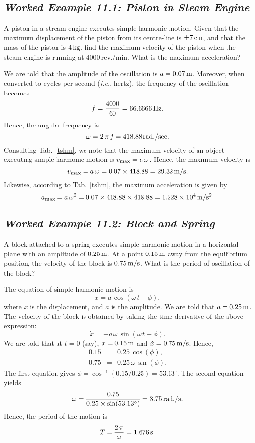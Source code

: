 \subsection*{\em Worked Example 11.1: Piston in Steam Engine}
 A piston in a stream engine executes simple harmonic motion.
Given that the maximum displacement of the piston from its centre-line is $\pm 7\,{\rm cm}$,
and that the mass of the piston is $4\,{\rm kg}$, find the maximum velocity of the piston
when the steam engine is running at 4000\,rev./min. What is the maximum acceleration?

 We are told that the amplitude of the oscillation is $a=0.07\,{\rm m}$. 
Moreover, when converted to cycles per second ({\em i.e.}, hertz), the frequency of the oscillation becomes
$$
f = \frac{4000}{60} = 66.6666\,{\rm Hz}.
$$
Hence, the angular frequency is
$$
\omega = 2\,\pi\,f = 418.88\,{\rm rad./sec}.
$$
Consulting Tab.~\ref{tshm}, we note that the maximum velocity of an object executing
simple harmonic motion is $v_{\rm max} = a\,\omega$. Hence, the maximum velocity is
$$
v_{\rm max} = a\,\omega = 0.07\times 418.88 = 29.32\,{\rm m/s}.
$$
Likewise, according to Tab.~\ref{tshm}, the maximum acceleration is given by
$$
a_{\rm max} = a\,\omega^2 = 0.07 \times 418.88\times 418.88 = 1.228\times 10^4\,{\rm m/s^2}.
$$

\subsection*{\em Worked Example 11.2: Block and Spring}
 A block attached to a spring executes simple harmonic motion
in a horizontal plane with an amplitude of $0.25\,{\rm m}$. At a point $0.15\,{\rm m}$
away from the equilibrium position, the velocity of the block is $0.75\,{\rm m/s}$.
What is the period of oscillation of the block?

 The equation of simple harmonic motion is
$$
x = a\,\cos(\omega\,t-\phi),
$$
where $x$ is the displacement, and $a$ is the amplitude. We are told that  $a=0.25\,{\rm m}$.
The velocity of the block is obtained by taking the time derivative of the above expression:
$$
\dot{x} =-a\,\omega\,\sin(\omega\,t -\phi).
$$
We are told that at $t=0$ (say), $x = 0.15\,{\rm m}$ and $\dot{x} = 0.75\,{\rm m/s}$.
Hence, 
\begin{eqnarray}
0.15 &=& 0.25\,\cos(\phi),\nonumber\\[0.5ex]
0.75 &=& 0.25\,\omega\,\sin(\phi).\nonumber
\end{eqnarray}
The first equation gives $\phi = \cos^{-1}(0.15/0.25) = 53.13^\circ$. The
second equation yields
$$
\omega = \frac{0.75}{0.25\times\sin(53.13^\circ)} = 3.75\,{\rm rad./s}.
$$
Hence, the period of the motion is
$$
T = \frac{2\,\pi}{\omega} = 1.676\,{\rm s}.
$$

